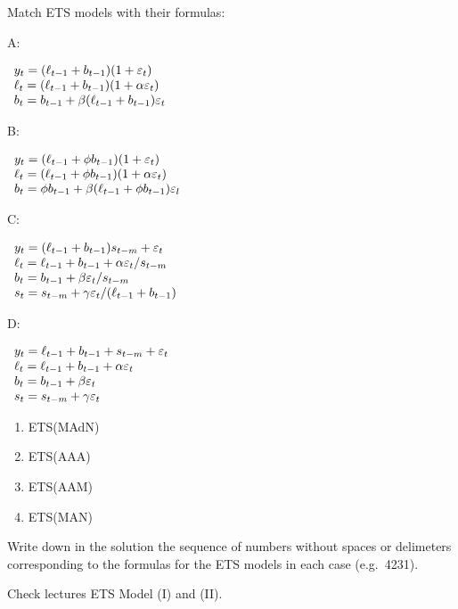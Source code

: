 
\begin{question}
Match ETS models with their formulas:

A:

\(\begin{array}{l c r}{y_{t}=(\ell_{t-1}+b_{t-1})(1+\varepsilon_{t})}\\ {\ell_{t}=(\ell_{t-1}+b_{t-1})(1+\alpha\varepsilon_{t})}\\ {b_{t}=b_{t-1}+\beta(\ell_{t-1}+b_{t-1})\varepsilon_{t}}\end{array}\)

B:

\(\begin{array}{l c r}{y_{t}=(\ell_{t-1}+\phi b_{t-1})(1+\varepsilon_{t})}\\ {\ell_{t}=(\ell_{t-1}+\phi b_{t-1})(1+\alpha\varepsilon_{t})}\\ {b_{t}=\phi b_{t-1}+\beta(\ell_{t-1}+\phi b_{t-1})\varepsilon_{l}}\end{array}\)

C:

\(\begin{array}{l c r}{{y_{t}=(\ell_{t-1}+b_{t-1})s_{t-m}+\varepsilon_{t}}}\\ {{\ell_{t}=\ell_{t-1}+b_{t-1}+\alpha\varepsilon_{t}/s_{t-m}}}\\ {{b_{t}=b_{t-1}+\beta\varepsilon_{t}/s_{t-m}}}\\ {{s_{t}=s_{t-m}+\gamma\varepsilon_{t}/(\ell_{t-1}+b_{t-1})}}\end{array}\)

D:

\(\begin{array}{l c r}{{y_{t}=\ell_{t-1}+b_{t-1}+s_{t-m}+\varepsilon_{t}}}\\ {{\ell_{t}=\ell_{t-1}+b_{t-1}+\alpha\varepsilon_{t}}}\\ {{b_{t}=b_{t-1}+\beta\varepsilon_{t}}}\\ {{s_{t}=s_{t-m}+\gamma\varepsilon_{t}}}\end{array}\)

\begin{enumerate}
\def\labelenumi{\arabic{enumi}.}
\item
  ETS(MAdN)
\item
  ETS(AAA)
\item
  ETS(AAM)
\item
  ETS(MAN)
\end{enumerate}

Write down in the solution the sequence of numbers without spaces or delimeters corresponding to the formulas for the ETS models in each case (e.g.~4231).
\end{question}

\begin{solution}
Check lectures ETS Model (I) and (II).
\end{solution}

